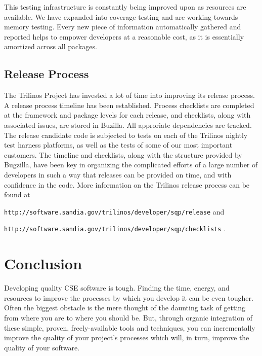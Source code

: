 \documentclass[12pt,relax]{article}
\newcommand{\InlineDirectory}[1]{
  {\hspace{0.01 in}} {\tt #1} {\hspace{0.01 in}}}
\begin{document}
This testing infrastructure is constantly being improved upon as resources are
available.  We have expanded into coverage testing and are working towards
memory testing.  Every new piece of information automatically gathered and
reported helps to empower developers at a reasonable cost, as it is essentially
amortized across all packages.

\subsection{Release Process}

The Trilinos Project has invested a lot of time into improving its release
process.  A release process timeline has been established.  Process 
checklists are completed at the framework and package
levels for each release, and checklists, along with associated issues, are 
stored in Buzilla.  All approriate dependencies are tracked.  The release 
candidate code is subjected to tests on each of the Trilinos nightly test 
harness platforms, as well as the tests of some of our most important 
customers.  The timeline and checklists, along with the structure provided 
by Bugzilla, have been key in organizing the complicated efforts of a large 
number of developers in such a way that releases can be provided on time, 
and with confidence in the code.  More information on the Trilinos release 
process can be found at \newline
\InlineDirectory{http://software.sandia.gov/trilinos/developer/sqp/release} 
and \newline
\InlineDirectory{http://software.sandia.gov/trilinos/developer/sqp/checklists}.



\section{Conclusion}
\label{Section:Conclusion}

Developing quality CSE software is tough.  Finding the time, energy, and
resources to improve the processes by which you develop it can be even tougher.
Often the biggest obstacle is the mere thought of the daunting task of getting
from where you are to where you should be.  But, through organic integration of
these simple, proven, freely-available tools and techniques, you can
incrementally improve the quality of your project's processes which will, in
turn, improve the quality of your software.
\end{document}
